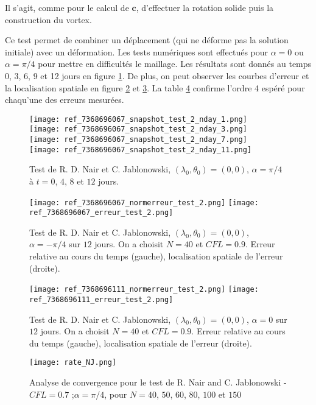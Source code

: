 Il s'agit, comme pour le calcul de $\mathbf{c}$, d'effectuer la rotation solide puis la construction du vortex.

Ce test permet de combiner un déplacement (qui ne déforme pas la solution initiale) avec un déformation. Les tests numériques sont effectués pour $\alpha = 0$ ou $\alpha = \pi/4$ pour mettre en difficultés le maillage. Les résultats sont donnés au temps 0, 3, 6, 9 et 12 jours en figure \ref{fig NJ1}. De plus, on peut observer les courbes d'erreur et la localisation spatiale en figure \ref{fig NJ2} et \ref{fig NJ3}. La table \ref{table NJ1} confirme l'ordre 4 espéré pour chaqu'une des erreurs mesurées.

\begin{figure}[ht]
\begin{center}
\texttt{[image: ref\_7368696067\_snapshot\_test\_2\_nday\_1.png]}\\
\texttt{[image: ref\_7368696067\_snapshot\_test\_2\_nday\_3.png]}\\
\texttt{[image: ref\_7368696067\_snapshot\_test\_2\_nday\_7.png]}\\
\texttt{[image: ref\_7368696067\_snapshot\_test\_2\_nday\_11.png]}\\
\caption{Test de R. D. Nair et C. Jablonowski, $(\lambda_0, \theta_0) = (0,0)$, $\alpha= \pi/4$ à $t=0$, $4$, $8$ et $12$ jours.}
\label{fig NJ1}
\end{center}
\end{figure}

\begin{figure}[ht]
\begin{center}
\texttt{[image: ref\_7368696067\_normerreur\_test\_2.png]}
\texttt{[image: ref\_7368696067\_erreur\_test\_2.png]}
\caption{Test de R. D. Nair et C. Jablonowski, $(\lambda_0, \theta_0) = (0,0)$, $\alpha= -\pi/4$ sur $12$ jours. On a choisit $N=40$ et $CFL=0.9$. Erreur relative au cours du temps (gauche), localisation spatiale de l'erreur (droite).}
\label{fig NJ2}
\end{center}
\end{figure}

\begin{figure}[ht]
\begin{center}
\texttt{[image: ref\_7368696111\_normerreur\_test\_2.png]}
\texttt{[image: ref\_7368696111\_erreur\_test\_2.png]}
\caption{Test de R. D. Nair et C. Jablonowski, $(\lambda_0, \theta_0) = (0,0)$, $\alpha= 0$ sur $12$ jours. On a choisit $N=40$ et $CFL=0.9$. Erreur relative au cours du temps (gauche), localisation spatiale de l'erreur (droite).}
\label{fig NJ3}
\end{center}
\end{figure}

\begin{figure}[ht]
\begin{center}
\texttt{[image: rate\_NJ.png]}
\caption{Analyse de convergence pour le test de R. Nair and C. Jablonowski -
$CFL = 0.7$ ;$ \alpha = \pi/4$, pour $N = 40$, $50$, $60$, $80$, $100$ et $150$}
\label{table NJ1}
\end{center}
\end{figure}